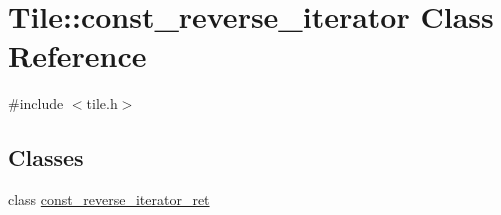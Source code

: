 \hypertarget{classTile_1_1const__reverse__iterator}{}\section{Tile\+:\+:const\+\_\+reverse\+\_\+iterator Class Reference}
\label{classTile_1_1const__reverse__iterator}


{\ttfamily \#include $<$tile.\+h$>$}

\subsection*{Classes}
\begin{DoxyCompactItemize}
\item 
class \hyperlink{classTile_1_1const__reverse__iterator_1_1const__reverse__iterator__ret}{const\+\_\+reverse\+\_\+iterator\+\_\+ret}
\end{DoxyCompactItemize}
